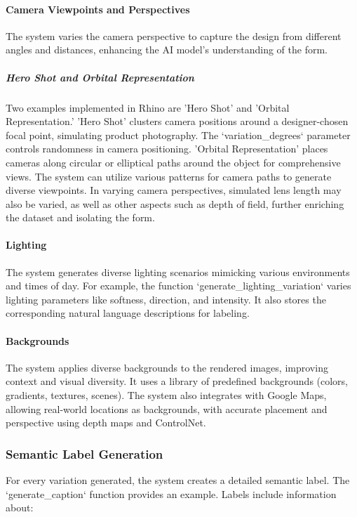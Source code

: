 \documentclass[12pt]{article}
\begin{document}
\paragraph{Camera Viewpoints and Perspectives}
The system varies the camera perspective to capture the design from different angles and distances, enhancing the AI model's understanding of the form.

\subparagraph{Hero Shot and Orbital Representation}
Two examples implemented in Rhino are 'Hero Shot' and 'Orbital Representation.' 'Hero Shot' clusters camera positions around a designer-chosen focal point, simulating product photography. The `variation\_degrees` parameter controls randomness in camera positioning. 'Orbital Representation' places cameras along circular or elliptical paths around the object for comprehensive views. The system can utilize various patterns for camera paths to generate diverse viewpoints. In varying camera perspectives, simulated lens length may also be varied, as well as other aspects such as depth of field, further enriching the dataset and isolating the form.

\paragraph{Lighting}
The system generates diverse lighting scenarios mimicking various environments and times of day. For example, the function `generate\_lighting\_variation` varies lighting parameters like softness, direction, and intensity. It also stores the corresponding natural language descriptions for labeling.

\paragraph{Backgrounds}
The system applies diverse backgrounds to the rendered images, improving context and visual diversity. It uses a library of predefined backgrounds (colors, gradients, textures, scenes). The system also integrates with Google Maps, allowing real-world locations as backgrounds, with accurate placement and perspective using depth maps and ControlNet.

\subsubsection{Semantic Label Generation}
For every variation generated, the system creates a detailed semantic label. The `generate\_caption` function provides an example. Labels include information about:
\end{document}
